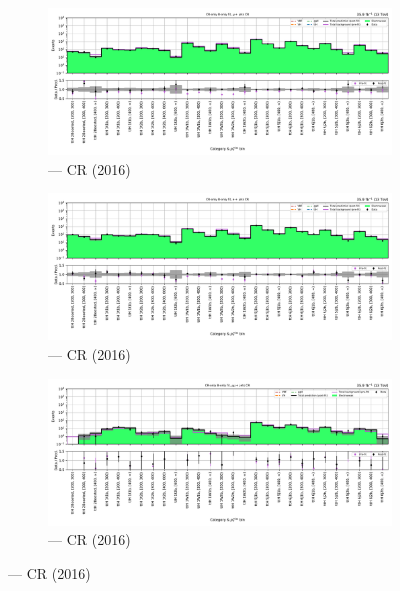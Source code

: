 \begin{figure}[htbp]
    \centering
    \begin{subfigure}[b]{0.65\textwidth}
        \includegraphics[width=\textwidth]{chapters/higgstoinv/figures/mountain_ranges/2016/ttH/Wmunu_tree_fit_b-abs_values_ttH_cats.pdf}
        \caption{\ttH --- \singleMuCr \gls{CR} (2016)}
    \end{subfigure}

    \begin{subfigure}[b]{0.65\textwidth}
        \includegraphics[width=\textwidth]{chapters/higgstoinv/figures/mountain_ranges/2016/ttH/Wenu_tree_fit_b-abs_values_ttH_cats.pdf}
        \caption{\ttH --- \singleEleCr \gls{CR} (2016)}
    \end{subfigure}

    \begin{subfigure}[b]{0.65\textwidth}
        \includegraphics[width=\textwidth]{chapters/higgstoinv/figures/mountain_ranges/2016/ttH/Zmumu_tree_fit_b-abs_values_ttH_cats.pdf}
        \caption{\ttH --- \doubleMuCr \gls{CR} (2016)}
    \end{subfigure}


\end{figure}
